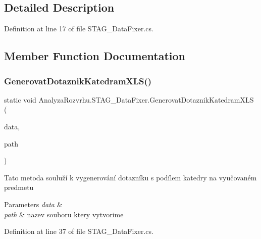\subsection{Detailed Description}


Definition at line 17 of file S\+T\+A\+G\+\_\+\+Data\+Fixer.\+cs.



\subsection{Member Function Documentation}
\mbox{\label{class_analyza_rozvrhu_1_1_s_t_a_g___data_fixer_ab241499d1fc1e784238f96afaafb6d64}} 
\subsubsection{\texorpdfstring{Generovat\+Dotaznik\+Katedram\+X\+L\+S()}{GenerovatDotaznikKatedramXLS()}}
{\footnotesize\ttfamily static void Analyza\+Rozvrhu.\+S\+T\+A\+G\+\_\+\+Data\+Fixer.\+Generovat\+Dotaznik\+Katedram\+X\+LS (\begin{DoxyParamCaption}\item[{this \hyperlink{class_analyza_rozvrhu_1_1_s_t_a_g___classes_1_1_s_t_a_g___database}{S\+T\+A\+G\+\_\+\+Classes.\+S\+T\+A\+G\+\_\+\+Database}}]{data,  }\item[{string}]{path }\end{DoxyParamCaption})\hspace{0.3cm}{\ttfamily [static]}}



Tato metoda souluží k vygenerování dotazníku s podílem katedry na vyučovaném predmetu 


\begin{DoxyParams}{Parameters}
{\em data} & \\
\hline
{\em path} & nazev souboru ktery vytvorime\\
\hline
\end{DoxyParams}


Definition at line 37 of file S\+T\+A\+G\+\_\+\+Data\+Fixer.\+cs.

